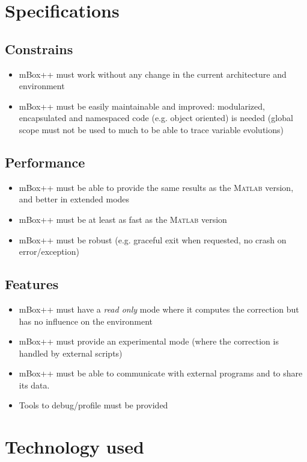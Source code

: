 \section{Specifications}

\subsection{Constrains}
\begin{itemize}
    \item mBox++ must work without any change in the current architecture and environment
    \item mBox++ must be easily maintainable and improved: modularized, encapsulated and namespaced code (e.g. object oriented) is needed (global scope must not be used to much to be able to trace variable evolutions)
\end{itemize}

\subsection{Performance}
\begin{itemize}
    \item mBox++ must be able to provide the same results as the \textsc{Matlab} version, and better in extended modes
    \item mBox++ must be at least as fast as the \textsc{Matlab} version
    \item mBox++ must be robust (e.g. graceful exit when requested, no crash on error/exception)
\end{itemize}

\subsection{Features}
\begin{itemize}
    \item mBox++ must have a \textit{read only} mode where it computes the correction but has no influence on the environment
    \item mBox++ must provide an experimental mode (where the correction is handled by external scripts)
    \item mBox++ must be able to communicate with external programs and to share its data.
    \item Tools to debug/profile must be provided
\end{itemize}

\section{Technology used}

